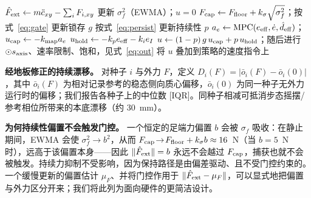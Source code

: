 \documentclass[journal]{IEEEtran}
\begin{document}
\begin{algorithm}[t]
\caption{置信度门控的捕获–保持仲裁（每个 50~Hz 步）}
\label{alg:layer}
\begin{algorithmic}[1]
\State $\hat F_{\rm ext}\gets m\ddot c_{xy}-\sum_i F_{i,xy}$ 
 更新 $\sigma_f^2$（EWMA）；\Return $u=0$ 
\EndIf
\State $F_{\rm cap}\gets F_{\rm floor}+k_\sigma\sqrt{\sigma_f^2}$；按式~\eqref{eq:gate} 更新锁存 $g$
\State 按式~\eqref{eq:persist} 更新持续性 $p$
\State $a_e\gets\mathrm{MPC}(e_{\rm eff},\dot e,\hat d_{\rm eff})$；$u_{\rm cap}\gets-k_{\rm map}a_e$
\State $u_{\rm hold}\gets-k_p e_{\rm eff}-k_i e_I$ 
\State $u\gets(1-p)\,g\,u_{\rm cap}+p\,u_{\rm hold}$；随后进行 $\odot s_{\rm axis}$、速率限制、饱和，见式~\eqref{eq:out}
\State 将 $u$ 叠加到策略的速度指令上
\end{algorithmic}
\end{algorithm}

\textbf{经地板修正的持续漂移。} 对种子 $i$ 与外力 $F$，定义 $D_i(F)=|\bar o_i(F)-\bar o_i(0)|$，其中 $\bar o_i(F)$ 为相对记录参考的稳态侧向质心偏移，$\bar o_i(0)$ 为同一种子无外力运行时的偏移；我们报告各种子上的中位数 [IQR]。同种子相减可抵消步态摇摆/参考相位所带来的本底漂移（约 30~mm）。

\textbf{为何持续性偏置不会触发门控。} 一个恒定的足端力偏置 $b$ 会被 $\sigma_f$ 吸收：在静止期间，EWMA 会使 $\sigma_f^2\!\to\!b^2$，从而 $F_{\rm cap}\!\to\!F_{\rm floor}+k_\sigma b\approx16$~N（当 $b=5$~N 时），远高于该偏置本身——因此 $\|\hat F_{\rm ext}\|=b$ 永远不会越过 $F_{\rm cap}$，捕获也就不会被触发。持续力抑制不受影响，因为保持路径是由偏差驱动、且不受门控约束的。一个缓慢更新的偏置估计 $\mu_F$、并将门控作用于 $\|\hat F_{\rm ext}-\mu_F\|$，可以显式地把偏置与外力区分开来；我们将此列为面向硬件的更简洁设计。
\end{document}
